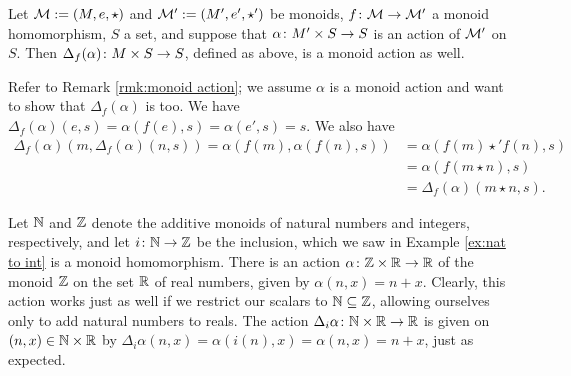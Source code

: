 \begin{blockRUS}
\end{blockRUS}

\begin{propositionENG}\label{prop:restriction of scalars}
Let $\mathcal{M}:=(M,e,\star)$ and $\mathcal{M}':=(M',e',\star')$ be monoids, $f\colon\mathcal{M}\rightarrow\mathcal{M}'$ a monoid homomorphism, $S$ a set, and suppose that $\alpha\colon M'\times S\rightarrow S$ is an action of $\mathcal{M}'$ on $S$. Then $\Delta_f(\alpha)\colon M\times S\rightarrow S$, defined as above, is a monoid action as well.
\end{propositionENG}

\begin{propositionRUS}\label{prop:restriction of scalars}
\end{propositionRUS}

\begin{proofENG}
Refer to Remark \ref{rmk:monoid action}; we assume $\alpha$ is a monoid action and want to show that $\Delta_f(\alpha)$ is too. We have $\Delta_f(\alpha)(e,s)=\alpha(f(e),s)=\alpha(e',s)=s$. We also have 
\begin{align*}
\Delta_f(\alpha)(m,\Delta_f(\alpha)(n,s))=\alpha(f(m),\alpha(f(n),s))&=\alpha(f(m)\star' f(n),s)\\
&=\alpha(f(m\star n),s)\\
&=\Delta_f(\alpha)(m\star n,s).
\end{align*}
\end{proofENG}

\begin{proofRUS}
\end{proofRUS}

\begin{exampleENG}
Let ${\mathbb N}$ and ${\mathbb Z}$ denote the additive monoids of natural numbers and integers, respectively, and let $i\colon{\mathbb N}\rightarrow{\mathbb Z}$ be the inclusion, which we saw in Example \ref{ex:nat to int} is a monoid homomorphism. There is an action $\alpha\colon{\mathbb Z}\times{\mathbb R}\rightarrow{\mathbb R}$ of the monoid ${\mathbb Z}$ on the set ${\mathbb R}$ of real numbers, given by $\alpha(n,x)=n+x$. Clearly, this action works just as well if we restrict our scalars to ${\mathbb N}\subseteq{\mathbb Z}$, allowing ourselves only to add natural numbers to reals. The action $\Delta_i\alpha\colon{\mathbb N}\times{\mathbb R}\rightarrow{\mathbb R}$ is given on $(n,x)\in{\mathbb N}\times{\mathbb R}$ by $\Delta_i\alpha(n,x)=\alpha(i(n),x)=\alpha(n,x)=n+x$, just as expected.
\end{exampleENG}

\begin{exampleRUS}
\end{exampleRUS}

